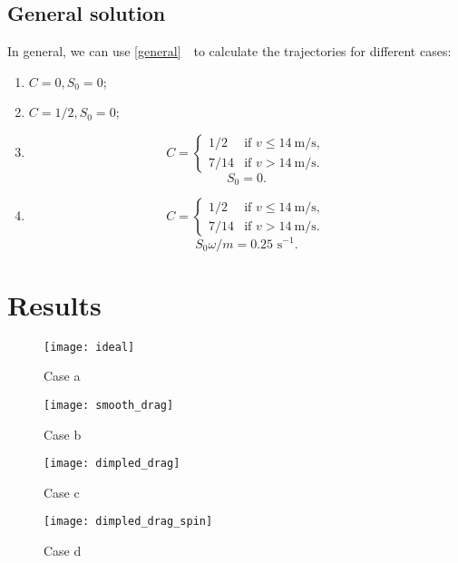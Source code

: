 \documentclass[a4paper]{article}
\begin{document}
	\subsection{General solution}
	In general, we can use \eqref{general} ~to calculate the trajectories for different cases:
	\begin{enumerate}[label=\alph*)]
		\item $C = 0, S_0 = 0$;
		\item $C = 1/2, 	S_0 = 0$;
		\item 
		\begin{fleqn}[0pt]
			\begin{equation*}
				C = \begin{cases}
 					1/2 & \text{if } v \leq 14\mathrm{~m/s}, \\
 					7/ 14 & \text{if } v > 14\mathrm{~m/s}.
 				\end{cases}
			\end{equation*}
			\begin{equation*}
				S_0 = 0.	
			\end{equation*}
		\end{fleqn}
		\item
		\begin{fleqn}[0pt]
			\begin{equation*}
				C = \begin{cases}
 					1/2 & \text{if } v \leq 14\mathrm{~m/s}, \\
 					7/ 14 & \text{if } v > 14\mathrm{~m/s}.
 				\end{cases}
			\end{equation*}
			\begin{equation*}
				S_0\omega / m = 0.25 \text{ s}^{-1}.	
			\end{equation*}
		\end{fleqn}
	\end{enumerate}
	
	\newpage
	\section{Results}
	\begin{figure}[H]
		\centering
		\texttt{[image: ideal]}
		\caption{Case a}
		\label{a}
		\texttt{[image: smooth\_drag]}
		\caption{Case b}
		\label{b}
	\end{figure}
	\newpage
	\begin{figure}[H]
		\centering
		\texttt{[image: dimpled\_drag]}
		\caption{Case c}
		\label{c}
		\texttt{[image: dimpled\_drag\_spin]}
		\caption{Case d}
		\label{d}
	\end{figure}
	
\end{document}
